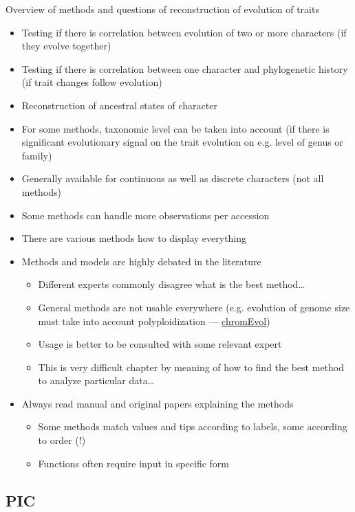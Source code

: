 \documentclass[compress, xelatex, 11pt, xcolor=svgnames, aspectratio=169, url={hyphens, lowtilde}]{beamer}
\begin{document}
\begin{frame}[allowframebreaks]{Overview of methods and questions of reconstruction of evolution of traits}
	\begin{itemize}
		\item Testing if there is correlation between evolution of two or more characters (if they evolve together)
		\item Testing if there is correlation between one character and phylogenetic history (if trait changes follow evolution)
		\item Reconstruction of ancestral states of character
		\item For some methods, taxonomic level can be taken into account (if there is significant evolutionary signal on the trait evolution on e.g. level of genus or family)
		\item Generally available for continuous as well as discrete characters (not all methods)
		\item Some methods can handle more observations per accession
		\item There are various methods how to display everything
		\item Methods and models are highly debated in the literature
		\begin{itemize}
			\item Different experts commonly disagree what is the best method\ldots
			\item General methods are not usable everywhere (e.g. evolution of genome size must take into account polyploidization --- \href{https://chromevol.evolseq.net/}{chromEvol})
			\item Usage is better to be consulted with some relevant expert
			\item This is very difficult chapter by meaning of how to find the best method to analyze particular data\ldots
		\end{itemize}
		\item Always read manual and original papers explaining the methods
			\begin{itemize}
				\item Some methods match values and tips according to labels, some according to order (\alert{!})
				\item Functions often require input in specific form
			\end{itemize}
	\end{itemize}
\end{frame}

\subsection{PIC}
\end{document}
